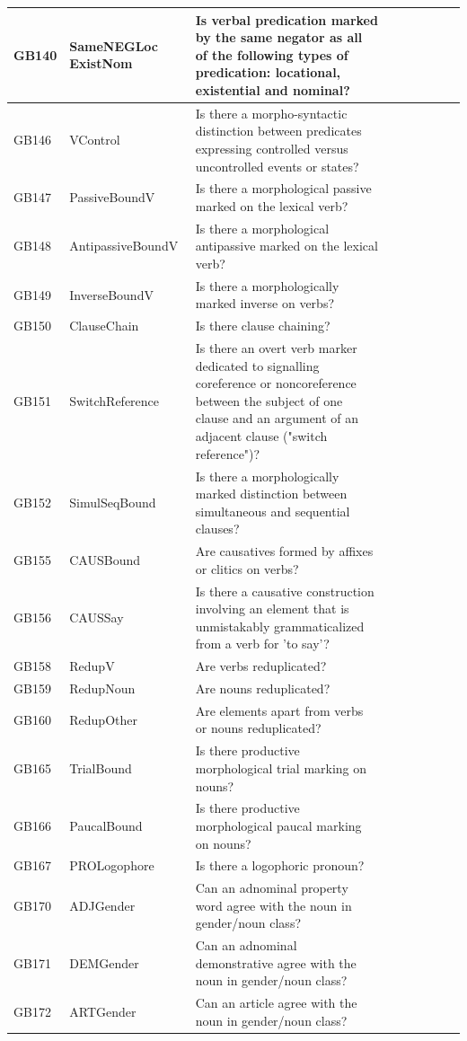 \documentclass[a4paper,10pt]{article} %
\begin{document}
\begin{landscape}
\begin{longtable}{| l | p{4cm}| p{12cm}|p{2cm}|p{2cm}|p{2cm}|p{2cm}|p{2cm}|p{2cm}|}
GB140 & SameNEGLoc ExistNom&Is verbal predication marked by the same negator as all of the following types of predication: locational, existential and nominal?\\ \hline
GB146 & VControl&Is there a morpho-syntactic distinction between predicates expressing controlled versus uncontrolled events or states?\\ \hline
GB147 & PassiveBoundV&Is there a morphological passive marked on the lexical verb?\\ \hline
GB148 & AntipassiveBoundV&Is there a morphological antipassive marked on the lexical verb?\\ \hline
GB149 & InverseBoundV&Is there a morphologically marked inverse on verbs?\\ \hline
GB150 & ClauseChain&Is there clause chaining?\\ \hline
GB151 & SwitchReference&Is there an overt verb marker dedicated to signalling coreference or noncoreference between the subject of one clause and an argument of an adjacent clause ("switch reference")?\\ \hline
GB152 & SimulSeqBound&Is there a morphologically marked distinction between simultaneous and sequential clauses?\\ \hline
GB155 & CAUSBound&Are causatives formed by affixes or clitics on verbs?\\ \hline
GB156 & CAUSSay&Is there a causative construction involving an element that is unmistakably grammaticalized from a verb for 'to say'?\\ \hline
GB158 & RedupV&Are verbs reduplicated?\\ \hline
GB159 & RedupNoun&Are nouns reduplicated?\\ \hline
GB160 & RedupOther&Are elements apart from verbs or nouns reduplicated?\\ \hline
GB165 & TrialBound&Is there productive morphological trial marking on nouns?\\ \hline
GB166 & PaucalBound&Is there productive morphological paucal marking on nouns?\\ \hline
GB167 & PROLogophore&Is there a logophoric pronoun?\\ \hline
GB170 & ADJGender&Can an adnominal property word agree with the noun in gender/noun class?\\ \hline
GB171 & DEMGender&Can an adnominal demonstrative agree with the noun in gender/noun class?\\ \hline
GB172 & ARTGender&Can an article agree with the noun in gender/noun class?\\ \hline

\end{longtable}
\end{landscape}
\end{document}
